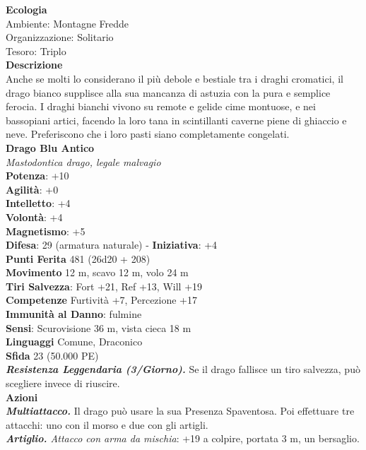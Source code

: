 \begin{multicols}{2}
\textbf{Ecologia}\\
Ambiente: Montagne Fredde\\
Organizzazione: Solitario\\
Tesoro: Triplo\\
\textbf{Descrizione}\\
Anche se molti lo considerano il più debole e bestiale tra i draghi cromatici, il drago bianco supplisce alla sua mancanza di astuzia con la pura e semplice ferocia. I draghi bianchi vivono su remote e gelide cime montuose, e nei bassopiani artici, facendo la loro tana in scintillanti caverne piene di ghiaccio e neve. Preferiscono che i loro pasti siano completamente congelati.\\


\medskip\textbf{Drago Blu Antico}\\
\emph{Mastodontica drago, legale malvagio}\\
\textbf{Potenza}: +10\\
\textbf{Agilità}: +0\\
\textbf{Intelletto}: +4\\
\textbf{Volontà}: +4\\
\textbf{Magnetismo}: +5\\	
\textbf{Difesa}: 29 (armatura naturale) - \textbf{Iniziativa}: +4\\
\textbf{Punti Ferita} 481 (26d20 + 208)\\
\textbf{Movimento} 12 m, scavo 12 m, volo 24 m\\
\textbf{Tiri Salvezza}: Fort +21, Ref +13, Will +19\\
\textbf{Competenze} Furtività +7, Percezione +17\\
\textbf{Immunità al Danno}: fulmine\\
\textbf{Sensi}: Scurovisione 36 m, vista cieca 18 m\\
\textbf{Linguaggi} Comune, Draconico\\
\textbf{Sfida} 23 (50.000 PE)\smallskip\\
\emph{\textbf{Resistenza Leggendaria (3/Giorno).}} Se il drago fallisce un tiro salvezza, può scegliere invece di riuscire. \\
\smallskip\textbf{Azioni}\\
\emph{\textbf{Multiattacco.}} Il drago può usare la sua Presenza Spaventosa. Poi effettuare tre attacchi: uno con il morso e due con gli artigli.\\
\emph{\textbf{Artiglio.} Attacco con arma da mischia}: +19 a colpire, portata 3 m, un bersaglio.\\

\end{multicols}
